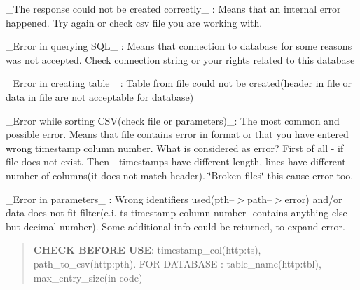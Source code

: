 {\ttfamily \+\_\+\+The response could not be created correctly\+\_\+} \+: Means that an internal error happened. Try again or check csv file you are working with.

{\ttfamily \+\_\+\+Error in querying S\+Q\+L\+\_\+} \+: Means that connection to database for some reasons was not accepted. Check connection string or your rights related to this database

{\ttfamily \+\_\+\+Error in creating table\+\_\+} \+: Table from file could not be created(header in file or data in file are not acceptable for database)

{\ttfamily \+\_\+\+Error while sorting C\+S\+V(check file or parameters)\+\_\+}\+: The most common and possible error. Means that file contains error in format or that you have entered wrong timestamp column number. What is considered as error? First of all -\/ if file does not exist. Then -\/ timestamps have different length, lines have different number of columns(it does not match header). \char`\"{}\+Broken files\char`\"{} this cause error too.

{\ttfamily \+\_\+\+Error in parameters\+\_\+} \+: Wrong identifiers used(pth--$>$path--$>$error) and/or data does not fit filter(e.\+i. ts-\/timestamp column number-\/ contains anything else but decimal number). Some additional info could be returned, to expand error.

\begin{quote}
{\bfseries C\+H\+E\+CK B\+E\+F\+O\+RE U\+SE}\+: timestamp\+\_\+col(http\+:ts), path\+\_\+to\+\_\+csv(http\+:pth). F\+OR D\+A\+T\+A\+B\+A\+SE \+: table\+\_\+name(http\+:tbl), max\+\_\+entry\+\_\+size(in code)\end{quote}
